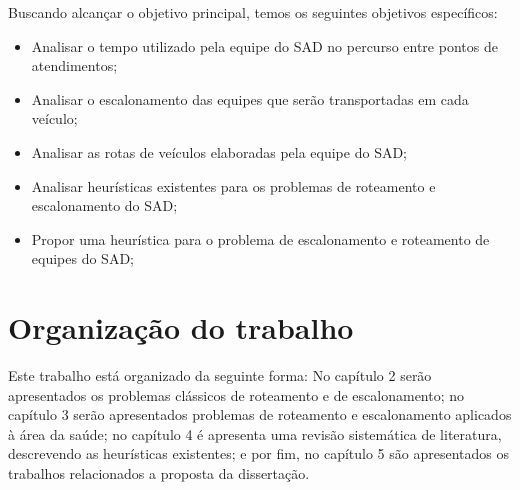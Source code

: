 Buscando alcançar o objetivo principal, temos os seguintes objetivos específicos:
\begin{itemize}
\item Analisar o tempo utilizado pela equipe do \ac{SAD} no percurso entre pontos de atendimentos;
\item Analisar o escalonamento das equipes que serão transportadas em cada veículo;
\item Analisar as rotas de veículos elaboradas pela equipe do \ac{SAD};
\item Analisar heurísticas existentes para os problemas de roteamento e escalonamento do \ac{SAD};
\item Propor uma heurística para o problema de escalonamento e roteamento de equipes do \ac{SAD};
\end{itemize}


\section{Organização do trabalho}
Este trabalho está organizado da seguinte forma: No capítulo 2 serão apresentados os problemas clássicos de roteamento e de escalonamento; no capítulo 3 serão apresentados problemas de roteamento e escalonamento aplicados à área da saúde; no capítulo 4 é apresenta uma revisão sistemática de literatura, descrevendo as heurísticas existentes; e por fim, no capítulo 5 são apresentados os trabalhos relacionados a proposta da dissertação. 
    



 
